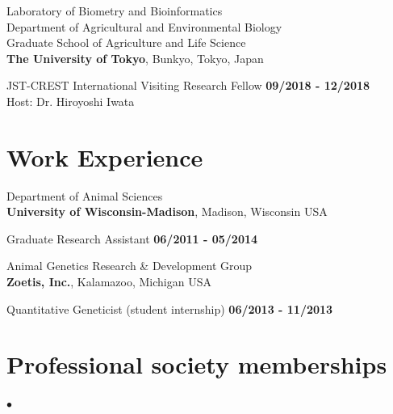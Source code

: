 \documentclass[margin,line,10pt]{res}
\newenvironment{list2}{
  \begin{list}{$\bullet$}{%
      \setlength{\itemsep}{0in}
      \setlength{\parsep}{0in} \setlength{\parskip}{0in}
      \setlength{\topsep}{0in} \setlength{\partopsep}{0in} 
      \setlength{\leftmargin}{0.2in}}}{\end{list}}
\begin{document}
\begin{resume}
Laboratory of Biometry and Bioinformatics\\
Department of Agricultural and Environmental Biology \\
Graduate School of Agriculture and Life Science \\
{\bf The University of Tokyo}, Bunkyo, Tokyo, Japan
\vspace{-.35cm}

JST-CREST International Visiting Research Fellow  \hfill {\bf 09/2018 - 12/2018}\\
Host: Dr. Hiroyoshi Iwata


  


\vspace{0.4cm}
\section{\sc Work \phantom{1cm} Experience}
Department of Animal Sciences\\
{\bf University of Wisconsin-Madison}, Madison, Wisconsin USA
\vspace{-.35cm}

Graduate Research Assistant   \hfill {\bf 06/2011 - 05/2014}\\
\vspace{-.4cm}

Animal Genetics Research \& Development  Group \\
{\bf Zoetis, Inc.}, Kalamazoo, Michigan USA

\vspace{-.35cm}

Quantitative Geneticist (student internship)   \hfill {\bf 06/2013 - 11/2013}\\








\vspace{0.5cm}
\section{\sc Professional society memberships}
\begin{list2}


\end{list2}
\end{resume}
\end{document}
